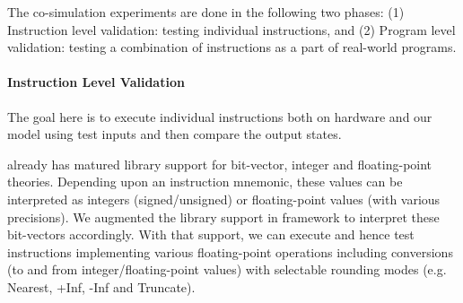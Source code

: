 The co-simulation experiments are done in the following two phases: (1) Instruction level validation: testing individual instructions, and (2) Program level validation: testing a combination of instructions  as a part of real-world programs. 

\paragraph{Instruction Level Validation}

The goal here is to execute individual instructions both on hardware and our model using test inputs and then compare the output states. 

\K already has matured library support for bit-vector, integer and floating-point theories.  Depending upon an instruction mnemonic, these values can be interpreted as integers (signed/unsigned) or floating-point values (with various precisions).  We augmented the library support in \K framework to interpret these bit-vectors accordingly. With that support, we can execute and hence test instructions implementing various floating-point operations including conversions (to and from integer/floating-point values) with selectable rounding modes (e.g. Nearest, +Inf, -Inf and Truncate).   

